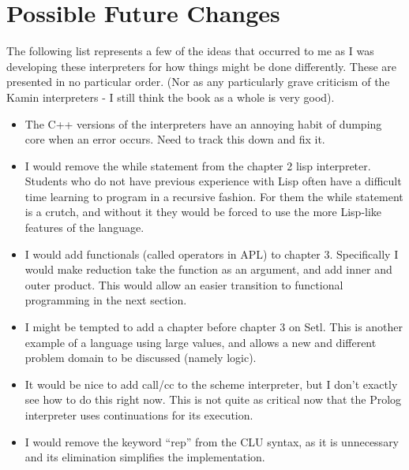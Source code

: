 \chapter*{Possible Future Changes}

The following list represents a few of the ideas that occurred to me as I
was developing these interpreters for how things might be done differently.
These are presented in no particular order.  (Nor as any particularly grave
criticism of the Kamin interpreters - I still think the book as a whole is
very good).
\begin{itemize}
\item
The C++ versions of the interpreters have an annoying habit of dumping 
core when an error occurs.  Need to track this down and fix it.
\item
I would remove the while statement from the chapter 2 lisp interpreter.
Students who do not have previous experience with Lisp often have a
difficult time learning to program in a recursive fashion.  For them the
while statement is a crutch, and without it they would be forced to use the
more Lisp-like features of the language.
\item
I would add functionals (called operators in APL) to chapter 3.
Specifically I would make reduction take the function as an argument, and
add inner and outer product.  This would allow an easier transition to
functional programming in the next section.
\item
I might be tempted to add a chapter before chapter 3 on Setl.  This is
another example of a language using large values, and allows a new and
different problem domain to be discussed (namely logic).
\item
It would be nice to add call/cc to the scheme interpreter, but I don't exactly 
see how to do this right now.  
This is not quite as critical now that the Prolog interpreter uses
continuations for its execution.
\item
I would remove the keyword ``rep'' from the CLU syntax, as it is
unnecessary and its elimination simplifies the implementation.
\end{itemize}
